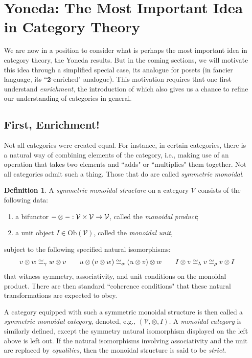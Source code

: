 \documentclass[a4paper]{book}
\theoremstyle{definition}
\theoremstyle{definition}
\newtheorem{definition}{Definition}[section]
\theoremstyle{definition}
\theoremstyle{theorem}
\theoremstyle{definition}
\begin{document}
\section{Yoneda: The Most Important Idea in Category Theory}
We are now in a position to consider what is perhaps the most important idea in category theory, the Yoneda results. But in the coming sections, we will motivate this idea through a simplified special case, its analogue for posets (in fancier language, its ``$\textbf{2}$-enriched" analogue). This motivation requires that one first understand \textit{enrichment}, the introduction of which also gives us a chance to refine our understanding of categories in general.  
\subsection{First, Enrichment!}
Not all categories were created equal. For instance, in certain categories, there is a natural way of combining elements of the category, i.e., making use of an operation that takes two elements and ``adds" or ``multiplies" them together. Not all categories admit such a thing. Those that do are called \textit{symmetric monoidal}. 
\begin{definition} 
	A \textit{symmetric monoidal structure} on a category $\mathcal{V}$ consists of the following data: 
	\begin{enumerate}
		\item a bifunctor $\-- \otimes \--: \mathcal{V} \times \mathcal{V} \rightarrow \mathcal{V}$, called the \textit{monoidal product}; 
		\item a unit object $I \in \text{Ob}(\mathcal{V})$, called the \textit{monoidal unit}, 
	\end{enumerate} 
	subject to the following specified natural isomorphisms: 
	\begin{equation}
	v \otimes w \cong_{\gamma} w \otimes v \hspace*{2em} u \otimes (v \otimes w) \cong_{\alpha} (u \otimes v) \otimes w \hspace*{2em} I \otimes v \cong_{\lambda} v \cong_{\rho} v \otimes I
	\end{equation}
	that witness symmetry, associativity, and unit conditions on the monoidal product. There are then standard ``coherence conditions" that these natural transformations are expected to obey. \par 
	A category equipped with such a symmetric monoidal structure is then called a \textit{symmetric monoidal category}, denoted, e.g., $(\mathcal{V}, \otimes, I)$. A \textit{monoidal category} is similarly defined, except the symmetry natural isomorphism displayed on the left above is left out. If the natural isomorphisms involving associativity and the unit are replaced by \textit{equalities}, then the monoidal structure is said to be \textit{strict}.
	\end{definition}  
\end{document}
